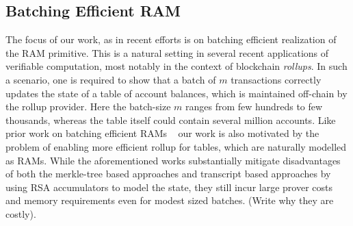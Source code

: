 \subsection{Batching Efficient RAM}\label{subsec:batching-efficient-ram}
The focus of our work, as in recent efforts \cite{USENIX:OWWB20, EPRINT:CFHKKO21} is on batching efficient
realization of the RAM primitive. This is a natural setting in several recent applications of verifiable
computation, most notably in the context of blockchain {\em rollups}. In such a scenario, one is required
to show that a batch of $m$ transactions correctly updates the state of a table of account balances, which
is maintained off-chain by the rollup provider. Here the batch-size $m$ ranges from few hundreds to few
thousands, whereas the table itself could contain several million accounts.
Like prior work on batching efficient
RAMs ~\cite{USENIX:OWWB20, EPRINT:CFHKKO21} our work is also motivated by the problem of enabling more efficient rollup for tables, which are
naturally modelled as RAMs. While the aforementioned works substantially mitigate disadvantages of both the
merkle-tree based approaches and transcript based approaches by using RSA accumulators to model the state,
they still incur large prover costs and memory requirements even for modest sized batches. (Write why they are
costly).




